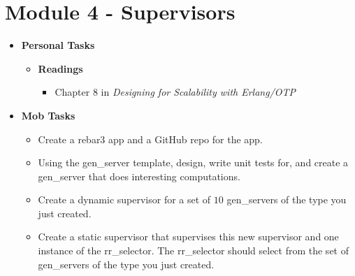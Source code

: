 \documentclass[12pt]{amsart}
\begin{document}
\section*{Module 4 - Supervisors}
	\begin{itemize}
		\item\textbf{ Personal Tasks}
    		\begin{itemize}
            		\item \textbf{Readings}
            		\begin{itemize}
            			\item Chapter 8 in \textit{Designing for Scalability with Erlang/OTP}
    			\end{itemize}
		\end{itemize}
		\item\textbf{ Mob Tasks}
			\begin{itemize}
				\item Create a rebar3 app and a GitHub repo for the app.
				\item Using the gen\_server template, design, write unit tests for, and create a gen\_server that does interesting computations.
                    		\item Create a dynamic supervisor for a set of $10$ gen\_servers of the type you just created.
                    		\item Create a static supervisor that supervises this new supervisor and one instance of the rr\_selector. The rr\_selector should select from the set of gen\_servers of the type you just created. 
		\end{itemize}
	\end{itemize}
		
\end{document}
